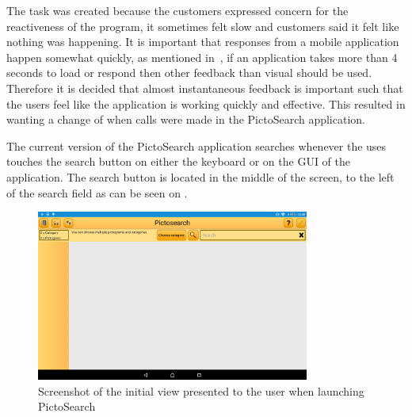The task was created because the customers expressed concern for the reactiveness of the program, it sometimes felt slow and customers said it felt like nothing was happening.
It is important that responses from a mobile application happen somewhat quickly, as mentioned in~\cite{Roto:2005:NNF:1062745.1062747}, if an application takes more than 4 seconds to load or respond then other feedback than visual should be used.
Therefore it is decided that almost instantaneous feedback is important such that the users feel like the application is working quickly and effective.
This resulted in wanting a change of when calls were made in the PictoSearch application.

The current version of the PictoSearch application searches whenever the uses touches the search button on either the keyboard or on the GUI of the application.
The search button is located in the middle of the screen, to the left of the search field as can be seen on .
\begin{figure}[h]
    \centering
    \includegraphics[width=0.8\textwidth]{figures/img/screenshots/old_startup.png}
    \caption{Screenshot of the initial view presented to the user when launching PictoSearch}\label{fig:screenshot_startup}
\end{figure}

